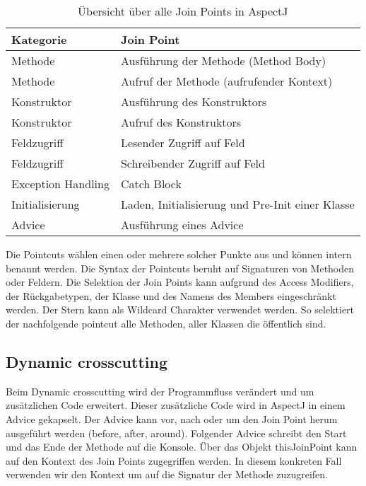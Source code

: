 \begin{table}[H]
	\centering
		\begin{tabular}{p{} p{}} \toprule
			\textbf{Kategorie} & \textbf{Join Point} \\ \midrule
			Methode & Ausführung der Methode (Method Body) \\ \midrule
			Methode & Aufruf der Methode (aufrufender Kontext) \\ \midrule
			Konstruktor & Ausführung des Konstruktors \\ \midrule
			Konstruktor & Aufruf des Konstruktors \\ \midrule
			Feldzugriff & Lesender Zugriff auf Feld \\ \midrule
			Feldzugriff & Schreibender Zugriff auf Feld \\ \midrule
			Exception Handling & Catch Block \\ \midrule
			Initialisierung & Laden, Initialisierung und Pre-Init einer Klasse \\ \midrule
			Advice & Ausführung eines Advice
			 \\ \bottomrule
		\end{tabular}
	\caption{Übersicht über alle Join Points in AspectJ}
	\label{tab:overview}
\end{table}

Die Pointcuts wählen einen oder mehrere solcher Punkte aus und können intern benannt werden. Die Syntax der Pointcuts beruht auf Signaturen von Methoden oder Feldern. Die Selektion der Join Points kann aufgrund des Access Modifiers, der Rückgabetypen, der Klasse und des Namens des Members eingeschränkt werden. Der Stern kann als Wildcard Charakter verwendet werden. So selektiert der nachfolgende pointcut alle Methoden, aller Klassen die öffentlich sind.



\subsection{Dynamic crosscutting}
Beim Dynamic crosscutting wird der Programmfluss verändert und um zusätzlichen Code erweitert. Dieser zusätzliche Code wird in AspectJ in einem Advice gekapselt. Der Advice kann vor, nach oder um den Join Point herum ausgeführt werden (before, after, around). Folgender Advice schreibt den Start und das Ende der Methode auf die Konsole. Über das Objekt thisJoinPoint kann auf den Kontext des Join Points zugegriffen werden. In diesem konkreten Fall verwenden wir den Kontext um auf die Signatur der Methode zuzugreifen.

